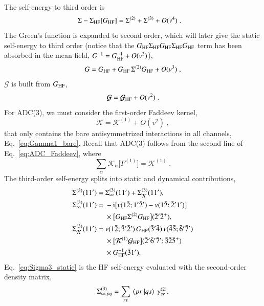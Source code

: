 \documentclass[aip,jcp,reprint,noshowkeys,superscriptaddress]{revtex4-1}
\newcommand{\cK}{\mathcal{K}}
\newcommand{\ii}{\mathrm{i}}
\begin{document}
The self-energy to third order is
\begin{align}
\Sigma-\Sigma_{\rm HF}[G_{\rm HF}]
&=
\Sigma^{(2)}+\Sigma^{(3)}+O(v^4) \;.
\end{align} 
The Green's function is expanded to second order,
which will later give the static self-energy to third order
(notice that the 
$G_{\rm HF}
\Sigma_{\rm HF}
G_{\rm HF}
\Sigma_{\rm HF}
G_{\rm HF}$ term has been absorbed in the mean field, 
$G^{-1}=G_{\rm HF}^{-1}+O(v^2)$),
\begin{equation}
G
=
G_{\rm HF}+G_{\rm HF}\,\Sigma^{(2)}G_{\rm HF}+O(v^3) \;,
\end{equation}
$\mathcal G$ is built from $G_{\rm HF}$,
\begin{equation}
\mathcal G=\mathcal G_{\rm HF}+O(v^2) \;.
\end{equation}
For ADC(3), we must consider the first-order 
Faddeev kernel, 
\begin{equation}
\cK
= \cK^{(1)}+O(v^2) \;,
\label{eq:K_first_order}
\end{equation}
that only contains the bare antisymmetrized interactions
in all channels, Eq.~\eqref{eq:Gamma1_bare}.
Recall that ADC(3) follows from the second line of
Eq.~\eqref{eq:ADC_Faddeev}, where
\begin{equation}
\sum_\alpha\cK_\alpha\big[F^{(1)}\big]=\cK^{(1)} \;.
\nonumber
\end{equation}
The third-order self-energy splits into 
static and dynamical contributions,
\begin{align}
\Sigma^{(3)}(11')
={}&
\Sigma^{(3)}_{\infty}(11')+\Sigma^{(3)}_{\cK}(11'),
\label{eq:Sigma3_split}
\\
\Sigma^{(3)}_{\infty}(11')
={}&
-\ii\big[v(1\bar2;1'\bar2')-v(1\bar2;\bar2'1')\big]
\nonumber\\
&\times
\big[G_{\rm HF}\Sigma^{(2)}G_{\rm HF}\big](\bar2'\bar2^+),
\label{eq:Sigma3_static}
\\
\Sigma^{(3)}_{\cK}(11')
={}&
v(1\bar2;\bar3'\bar2')\,G_{\rm HF}(\bar3'\bar4)\,v(\bar4\bar5;\bar6'\bar7')
\nonumber\\
&\times
\big[\cK^{(1)}\mathcal G_{\rm HF}\big](\bar2'\bar6'\bar7';\bar3\bar2\bar5^+)
\nonumber\\
&\times
G_{\rm HF}^{-1}(\bar3 1').
\label{eq:Sigma3_K}
\end{align}
Eq.~\eqref{eq:Sigma3_static} is the HF self-energy 
evaluated with the second-order density matrix,
\begin{equation}
\Sigma^{(3)}_{\infty,pq}
=
\sum_{rs}\mel{pr}{}{qs}\,\gamma^{(2)}_{sr}.
\end{equation}
\end{document}

